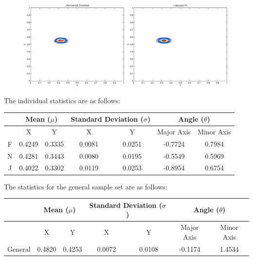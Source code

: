 \begin{figure}[h!]
    \includegraphics[width=0.49\textwidth]{Chapter2/Figs/JHands_XY_fBin.eps}
    \includegraphics[width=0.49\textwidth]{Chapter2/Figs/JHands_XY_gFit.eps}
\end{figure}

The individual statistics are as follows:
\newline

\begin{tabular}{|c|c|c|c|c|c|c|}
\hline
& \multicolumn{2}{|c|}{Mean ($\mu$)} & \multicolumn{2}{|c|}{Standard Deviation ($\sigma$)} & \multicolumn{2}{|c|}{Angle ($\theta$)} \\\hline
& X & Y & X & Y & Major Axis & Minor Axis \\\hline
F & 0.4249 & 0.3335 & 0.0081 & 0.0251 & -0.7724 & 0.7984 \\\hline
N & 0.4281 & 0.3443 & 0.0080 & 0.0195 & -0.5549 & 0.5969 \\\hline
J & 0.4022 & 0.3302 & 0.0119 & 0.0253 & -0.8954 & 0.6754 \\\hline
\end{tabular}
\newline
\vspace{0.5 cm}
\newline
The statistics for the general sample set are as follows:
\newline

\begin{tabular}{|c|c|c|c|c|c|c|}
\hline
& \multicolumn{2}{|c|}{Mean ($\mu$)} & \multicolumn{2}{|c|}{Standard Deviation ($\sigma$)} & \multicolumn{2}{|c|}{Angle ($\theta$)} \\\hline
& X & Y & X & Y & Major Axis & Minor Axis \\\hline
General & 0.4820 & 0.4253 & 0.0072 & 0.0108 & -0.1174 & 1.4534 \\\hline
\end{tabular}



